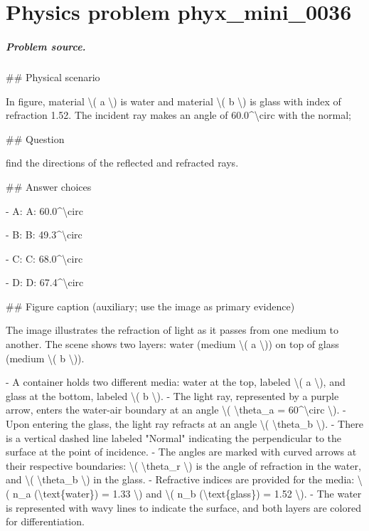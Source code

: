 
\chapter{Physics problem phyx\_mini\_0036}
\label{ch:PhyXMiniProblems_problem_phyx_mini_0036}

\paragraph{Problem source.}
\#\# Physical scenario

In figure, material \textbackslash{}( a \textbackslash{}) is water and material \textbackslash{}( b \textbackslash{}) is glass with index of refraction 1.52. The incident ray makes an angle of 60.0\textasciicircum{}\textbackslash{}circ with the normal;

\#\# Question

find the directions of the reflected and refracted rays.

\#\# Answer choices

- A: A: 60.0\textasciicircum{}\textbackslash{}circ

- B: B: 49.3\textasciicircum{}\textbackslash{}circ

- C: C: 68.0\textasciicircum{}\textbackslash{}circ

- D: D: 67.4\textasciicircum{}\textbackslash{}circ

\#\# Figure caption (auxiliary; use the image as primary evidence)

The image illustrates the refraction of light as it passes from one medium to another. The scene shows two layers: water (medium \textbackslash{}( a \textbackslash{})) on top of glass (medium \textbackslash{}( b \textbackslash{})).

- A container holds two different media: water at the top, labeled \textbackslash{}( a \textbackslash{}), and glass at the bottom, labeled \textbackslash{}( b \textbackslash{}).
- The light ray, represented by a purple arrow, enters the water-air boundary at an angle \textbackslash{}( \textbackslash{}theta\_a = 60\textasciicircum{}\textbackslash{}circ \textbackslash{}).
- Upon entering the glass, the light ray refracts at an angle \textbackslash{}( \textbackslash{}theta\_b \textbackslash{}).
- There is a vertical dashed line labeled "Normal" indicating the perpendicular to the surface at the point of incidence.
- The angles are marked with curved arrows at their respective boundaries: \textbackslash{}( \textbackslash{}theta\_r \textbackslash{}) is the angle of refraction in the water, and \textbackslash{}( \textbackslash{}theta\_b \textbackslash{}) in the glass.
- Refractive indices are provided for the media: \textbackslash{}( n\_a (\textbackslash{}text\{water\}) = 1.33 \textbackslash{}) and \textbackslash{}( n\_b (\textbackslash{}text\{glass\}) = 1.52 \textbackslash{}).
- The water is represented with wavy lines to indicate the surface, and both layers are colored for differentiation.

